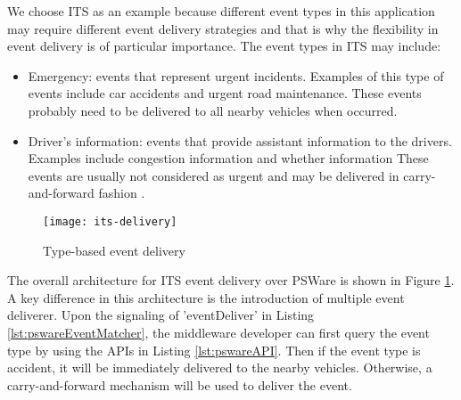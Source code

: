 We choose ITS as an example because different event types in this application may require different event delivery strategies and that is why the flexibility in event delivery is of particular importance. The event types in ITS may include:
\begin{itemize}
\item Emergency: events that represent urgent incidents. Examples of this type of events include car accidents and urgent road maintenance. These events probably need to be delivered to all nearby vehicles when occurred.
\item Driver's information: events that provide assistant information to the drivers. Examples include congestion information and whether information These events are usually not considered as urgent and may be delivered in carry-and-forward fashion \cite{cartel}.
\end{itemize}

\begin{figure}
\centering
\texttt{[image: its-delivery]}
\caption{Type-based event delivery}
\label{fig:its-delivery}
\end{figure}

The overall architecture for ITS event delivery over PSWare is shown in Figure \ref{fig:its-delivery}. A key difference in this architecture is the introduction of multiple event deliverer. Upon the signaling of 'eventDeliver' in Listing \ref{lst:pswareEventMatcher}, the middleware developer can first query the event type by using the APIs in Listing \ref{lst:pswareAPI}. Then if the event type is accident, it will be immediately delivered to the nearby vehicles. Otherwise, a carry-and-forward mechanism will be used to deliver the event.

